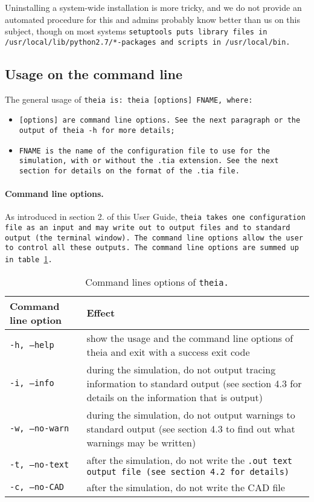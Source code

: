 \documentclass{article}
\begin{document}
Uninstalling a system-wide installation is more tricky, and we do not provide an automated procedure for this and admins probably know better than us on this subject, though on most systems \tt{setuptools} puts library files in \tt{/usr/local/lib/python2.7/*-packages} and scripts in \tt{/usr/local/bin}.

\subsection{Usage on the command line}
The general usage of \tt{theia} is: \tt{theia [options] FNAME}, where:

\begin{itemize}
\item \tt{[options]} are command line options. See the next paragraph or the output of \tt{theia -h} for more details;
\item \tt{FNAME} is the name of the configuration file to use for the simulation, with or without the \tt{.tia} extension. See the next section for details on the format of the \tt{.tia} file.
\end{itemize}

\paragraph{Command line options.}As introduced in section 2. of this User Guide, \tt{theia} takes one configuration file as an input and may write out to output files and to standard output (the terminal window). The command line options allow the user to control all these outputs. The command line options are summed up in table \ref{option}.


\begin{table}[h]
\begin{center}
\begin{tabular}{| p{4cm} | p{10cm} |}
\hline
\textbf{Command line option} & \textbf{Effect} \\
\hline \hline
\tt{-h, --help} & show the usage and the command line options of theia and exit with a success exit code\\
\hline
\tt{-i, --info} & during the simulation, do not output tracing information to standard output (see section 4.3 for details on the information that is output)\\
\hline
\tt{-w, --no-warn} & during the simulation, do not output warnings to standard output (see section 4.3 to find out what warnings may be written)\\
\hline
\tt{-t, --no-text} & after the simulation, do not write the \tt{.out} text output file (see section 4.2 for details)\\
\hline
\tt{-c, --no-CAD} & after the simulation, do not write the CAD file\\
\hline
\end{tabular}
\end{center}
\caption{Command lines options of \tt{theia}.}
\label{option}
\end{table}
\end{document}
